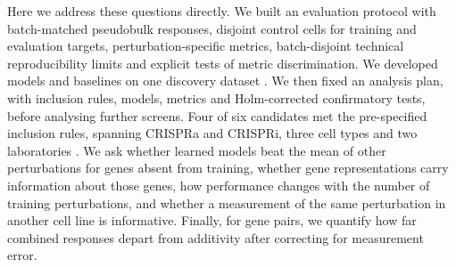 Here we address these questions directly. We built an evaluation protocol with batch-matched pseudobulk responses, disjoint control cells for training and evaluation targets, perturbation-specific metrics, batch-disjoint technical reproducibility limits and explicit tests of metric discrimination. We developed models and baselines on one discovery dataset \citep{norman2019}. We then fixed an analysis plan, with inclusion rules, models, metrics and Holm-corrected confirmatory tests, before analysing further screens. Four of six candidates met the pre-specified inclusion rules, spanning CRISPRa and CRISPRi, three cell types and two laboratories \citep{replogle2022,tian2021}. We ask whether learned models beat the mean of other perturbations for genes absent from training, whether gene representations carry information about those genes, how performance changes with the number of training perturbations, and whether a measurement of the same perturbation in another cell line is informative. Finally, for gene pairs, we quantify how far combined responses depart from additivity after correcting for measurement error.
